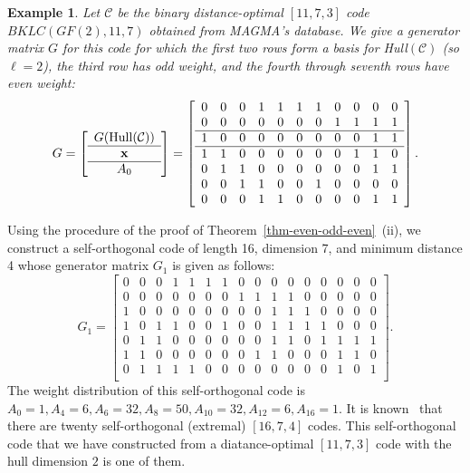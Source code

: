 \documentclass{article}
\theoremstyle{definition}
\newtheorem{example}{Example}[section]
\theoremstyle{remark}
\begin{document}
\begin{example}{\em
Let $\mathcal C$ be the binary distance-optimal $[11, 7, 3]$ code $BKLC(GF(2), 11, 7)$ obtained from MAGMA's database. We give a generator matrix $G$ for this code for which the first two rows form a basis for Hull$(\mathcal C)$ (so $\ell =2$), the third row has odd weight, and the fourth through seventh rows have even weight:
\[
G= \left[ \begin{array}{c}
G({\operatorname{Hull}}(\mathcal C)) \\
\hline
{\bf{x}} \\
\hline
A_0   \\
\end{array}
\right] = \left[
\begin{array}{ccccccccccc}
0& 0& 0& 1& 1& 1& 1& 0& 0& 0& 0 \\
0& 0& 0& 0& 0& 0& 0& 1& 1& 1& 1 \\
\hline
1& 0& 0& 0& 0& 0& 0& 0& 0& 1& 1 \\
\hline
1& 1& 0& 0& 0& 0& 0& 0& 1& 1& 0 \\
0& 1& 1& 0& 0& 0& 0& 0& 0& 1& 1 \\
0& 0& 1& 1& 0& 0& 1& 0& 0& 0& 0 \\
0& 0& 0& 1& 1& 0& 0& 0& 0& 1& 1 \\
\end{array}
\right].
\]

Using the procedure of the proof of Theorem~\ref{thm-even-odd-even}~(ii), we construct a self-orthogonal code of length 16, dimension 7, and minimum distance 4 whose generator matrix $G_1$ is given as follows:
\[
G_1 =\left[
\begin{array}{ccccccccccc|ccccc}
0& 0& 0& 1& 1& 1& 1& 0& 0& 0& 0 &0 &0 &0 &0 & 0  \\
0& 0& 0& 0& 0& 0& 0& 1& 1& 1& 1 &0 &0 &0 &0 & 0\\
\hline
1& 0& 0& 0& 0& 0& 0& 0& 0& 1& 1 & 1 & 0& 0& 0&0\\
\hline
1& 0& 1& 1& 0& 0& 1& 0& 0& 1& 1& 1& 1& 0& 0& 0 \\
0& 1& 1& 0& 0& 0& 0& 0& 0& 1& 1& 0& 1& 1& 1& 1 \\
1& 1& 0& 0& 0& 0& 0& 0& 1& 1& 0& 0& 0& 1& 1& 0 \\
0& 1& 1& 1& 1& 0& 0& 0& 0& 0& 0& 0& 0& 1& 0& 1 \\
\end{array}
\right].
\]
The weight distribution of this self-orthogonal code is $A_0 =1, A_4 =6, A_6=32, A_8=50, A_{10} =32, A_{12}=6, A_{16}=1$. It is known~\cite{Bouyukliev2006} that there are twenty self-orthogonal (extremal) $[16,7,4]$ codes. This self-orthogonal code that we have constructed from a diatance-optimal $[11, 7, 3]$ code with the hull dimension $2$ is one of them.
}
\end{example}
\end{document}
